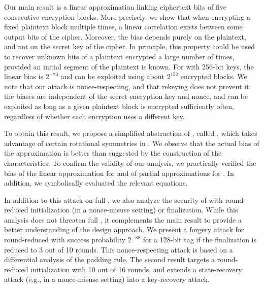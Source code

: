 Our main result is a linear approximation \cite{eurocryptMatsui93,eurocryptMatsuiY92} linking ciphertext bits of five consecutive encryption blocks.
More precisely, we show that when encrypting a fixed plaintext block multiple times, a linear correlation exists between some output bits of the cipher.
Moreover, the bias depends purely on the plaintext, and not on the secret key of the cipher.
In principle, this property could be used to recover unknown bits of a plaintext encrypted a large number of times, provided an initial segment of the plaintext is known.
For \MORUS[1280] with 256-bit keys, the linear bias is $2^{-73}$
and can be exploited using about $2^{152}$ encrypted blocks.
We note that our attack is nonce-respecting, and that rekeying does not prevent it: the biases are independent of the secret encryption key and nonce, and can be exploited as long as a given plaintext block is encrypted sufficiently often, regardless of whether each encryption uses a different key.

To obtain this result, we propose a simplified abstraction of \MORUS, called \MiniMORUS, which takes advantage of certain rotational symmetries in \MORUS.
We observe that the actual bias of the approximation is better than suggested by the construction of the characteristics.
To confirm the validity of our analysis,
we practically verified the bias of the linear approximation for \MiniMORUS and of partial approximations for \MORUS.
In addition, we symbolically evaluated the relevant equations.

In addition to this attack on full \MORUS, we also analyze the security of \MORUS with round-reduced initialization (in a nonce-misuse setting) or finalization.
While this analysis does not threaten full \MORUS, it complements the main result to provide a better understanding of the \MORUS design approach.
We present a forgery attack for round-reduced \MORUS[1280] with success probability $2^{-88}$ for a 128-bit tag if the finalization is reduced to 3 out of 10 rounds. This nonce-respecting attack is based on a differential analysis of the padding rule.
The second result targets a round-reduced initialization with 10 out of 16 rounds, and extends a state-recovery attack (e.g., in a nonce-misuse setting) into a key-recovery attack.

